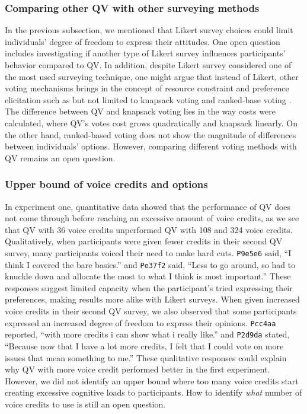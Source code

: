 \subsubsection{Comparing other QV with other surveying methods}
In the previous subsection, we mentioned that Likert survey choices could limit individuals' degree of freedom to express their attitudes. One open question includes investigating if another type of Likert survey influences participants' behavior compared to QV. In addition, despite Likert survey considered one of the most used surveying technique, one might argue that instead of Likert, other voting mechanisms brings in the concept of resource constraint and preference elicitation such as but not limited to knapsack voting \cite{goel2015knapsack} and ranked-base voting \cite{ledo2018evaluation}. The difference between QV and knapsack voting lies in the way costs were calculated, where QV's votes cost grows quadratically and knapsack linearly. On the other hand, ranked-based voting does not show the magnitude of differences between individuals' options. However, comparing different voting methods with QV remains an open question.

\subsubsection{Upper bound of voice credits and options}
In experiment one, quantitative data showed that the performance of QV does not come through before reaching an excessive amount of voice credits, as we see that QV with 36 voice credits unperformed QV with 108 and 324 voice credits. Qualitatively, when participants were given fewer credits in their second QV survey, many participants voiced their need to make hard cuts. \texttt{P9e5e6} said, ``I think I covered the bare basics.'' and \texttt{Pe37f2} said, ``Less to go around, so had to knuckle down and allocate the most to what I think is most important.'' These responses suggest limited capacity when the participant's tried expressing their preferences, making results more alike with Likert surveys. When given increased voice credits in their second QV survey, we also observed that some participants expressed an increased degree of freedom to express their opinions. \texttt{Pcc4aa} reported, ``with more credits i can show what i really like.'' and \texttt{P2d9da} stated, ``Because now that I have a lot more credits, I felt that I could vote on more issues that mean something to me.'' These qualitative responses could explain why QV with more voice credit performed better in the first experiment. However, we did not identify an upper bound where too many voice credits start creating excessive cognitive loads to participants. How to identify \textit{what} number of voice credits to use is still an open question.

